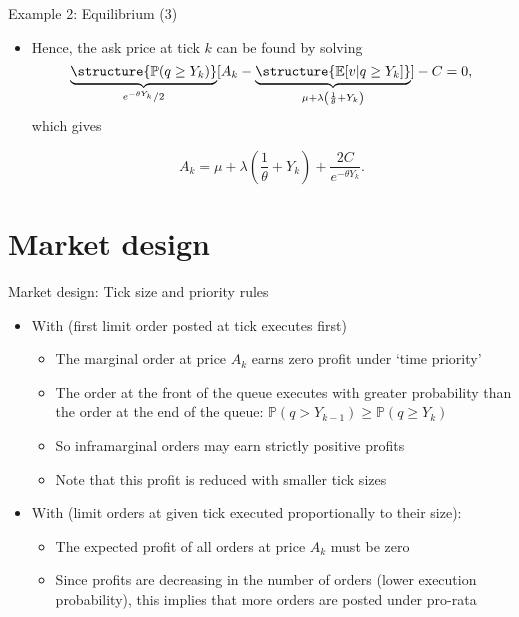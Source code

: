 \documentclass[english,10pt]{beamer}
\begin{document}
\begin{frame}{Example 2: Equilibrium (3)}
	\begin{itemize}
		\item Hence, the ask price at tick $k$ can be found by solving
		\[
		\underbrace{\structure{\mathbb{P}(q \geq Y_k)}}_{e^{-\theta Y_{k}}/2}[A_k-\underbrace{\structure{\mathbb{E}[v|q \geq Y_k]}}_{\mu + \lambda \left( \frac{1}{\theta }+ Y_{k} \right)}] - C = 0,
		\]
		which gives
		\begin{block}{}
			\[
			A_k=\mu + \lambda \left( \frac{1}{\theta }+ Y_{k}\right) + \frac{2C}{e^{-\theta Y_{k}}}.
			\]
		\end{block}
	\end{itemize}
\end{frame}



\section{Market design}

\begin{frame}{Market design: Tick size and priority rules}
	\begin{itemize}
		\item With  (first limit order posted at tick executes first)
		\begin{itemize}
			\item The marginal order at price $A_{k}$ earns zero profit under `time priority'
			\item The order at the front of the queue executes with greater  probability than the order at the end of the queue: $\mathbb{P}(q > Y_{k-1}) \ge \mathbb{P}(q \geq Y_{k})$
			\item So inframarginal orders may earn strictly positive profits
			\item Note that this profit is reduced with smaller tick sizes
		\end{itemize}
		\item With  (limit orders at given tick executed proportionally to their size):
		\begin{itemize}
			\item The expected profit of all orders at price $A_k$ must be zero
			\item Since profits are decreasing in the number of orders (lower execution probability), this implies that more orders are posted under pro-rata
		\end{itemize}
	\end{itemize}
\end{frame}
\end{document}
